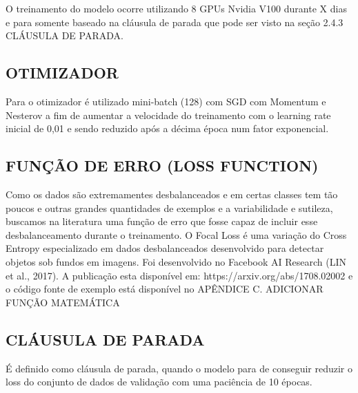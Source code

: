 O treinamento do modelo ocorre utilizando 8 GPUs Nvidia V100 durante X dias e para somente baseado na cláusula de parada que pode ser visto na seção 2.4.3 CLÁUSULA DE PARADA. 

\subsection{OTIMIZADOR}

Para o otimizador é utilizado mini-batch (128) com SGD com Momentum e Nesterov a fim de aumentar a velocidade do treinamento com o learning rate inicial de 0,01 e sendo reduzido após a décima época num fator exponencial.

\subsection{FUNÇÃO DE ERRO (LOSS FUNCTION)}

Como os dados são extremamentes desbalanceados e em certas classes tem tão poucos e outras grandes quantidades de exemplos e a variabilidade e sutileza, buscamos na literatura uma função de erro que fosse capaz de incluir esse desbalanceamento durante o treinamento.
O Focal Loss é uma variação do Cross Entropy especializado em dados desbalanceados desenvolvido para detectar objetos sob fundos em imagens. Foi desenvolvido no Facebook AI Research (LIN et al., 2017). A publicação esta disponível em: https://arxiv.org/abs/1708.02002 e o código fonte de exemplo está disponível no APÊNDICE C.
ADICIONAR FUNÇÃO MATEMÁTICA

\subsection{CLÁUSULA DE PARADA}

É definido como cláusula de parada, quando o modelo para de conseguir reduzir o loss do conjunto de dados de validação com uma paciência de 10 épocas.
